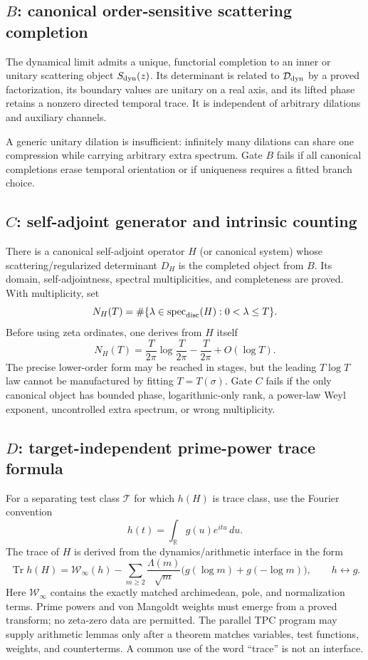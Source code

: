 \documentclass[11pt]{article}
\theoremstyle{definition}
\theoremstyle{remark}
\newcommand{\cD}{\mathcal D}
\newcommand{\cT}{\mathcal T}
\newcommand{\cW}{\mathcal W}
\newcommand{\Tr}{\operatorname{Tr}}
\begin{document}
\subsection{\texorpdfstring{$B$}{B}: canonical order-sensitive scattering completion}

The dynamical limit admits a unique, functorial completion to an inner or
unitary scattering object $S_{\rm dyn}(z)$.  Its determinant is related to
$\cD_{\rm dyn}$ by a proved factorization, its boundary values are unitary on
a real axis, and its lifted phase retains a nonzero directed temporal trace.
It is independent of arbitrary dilations and auxiliary channels.

A generic unitary dilation is insufficient: infinitely many dilations can
share one compression while carrying arbitrary extra spectrum.  Gate $B$
fails if all canonical completions erase temporal orientation or if
uniqueness requires a fitted branch choice.

\subsection{\texorpdfstring{$C$}{C}: self-adjoint generator and intrinsic counting}

There is a canonical self-adjoint operator $H$ (or canonical system) whose
scattering/regularized determinant $D_H$ is the completed object from $B$.
Its domain, self-adjointness, spectral multiplicities, and completeness are
proved.  With multiplicity, set
\[
 N_H(T)=\#\{\lambda\in\operatorname{spec}_{\rm disc}(H):0<\lambda\leq T\}.
\]
Before using zeta ordinates, one derives from $H$ itself
\[
 N_H(T)=\frac{T}{2\pi}\log\frac{T}{2\pi}
        -\frac{T}{2\pi}+O(\log T).
\]
The precise lower-order form may be reached in stages, but the leading
$T\log T$ law cannot be manufactured by fitting $T=T(\sigma)$.  Gate $C$
fails if the only canonical object has bounded phase, logarithmic-only rank,
a power-law Weyl exponent, uncontrolled extra spectrum, or wrong
multiplicity.

\subsection{\texorpdfstring{$D$}{D}: target-independent prime-power trace formula}

For a separating test class $\cT$ for which $h(H)$ is trace class, use the
Fourier convention
\[
 h(t)=\int_{\mathbb R}g(u)e^{itu}\,du.
\]
The trace of $H$ is derived from the dynamics/arithmetic interface in the
form
\[
 \Tr h(H)
 =\cW_\infty(h)
 -\sum_{m\ge2}\frac{\Lambda(m)}{\sqrt m}
   \bigl(g(\log m)+g(-\log m)\bigr),
 \qquad h\leftrightarrow g.
\]
Here $\cW_\infty$ contains the exactly matched archimedean, pole, and
normalization terms.  Prime powers and von Mangoldt weights must emerge from
a proved transform; no zeta-zero data are permitted.  The parallel TPC
program may supply arithmetic lemmas only after a theorem matches variables,
test functions, weights, and counterterms.  A common use of the word
``trace'' is not an interface.
\end{document}
